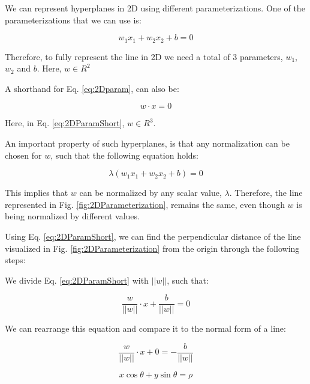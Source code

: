 \documentclass[11pt]{article}
\begin{document}
We can represent hyperplanes in 2D using different parameterizations. One of the parameterizations that we can use is:

\begin{equation} \label{eq:2Dparam}
    w_{1}x_{1} + w_{2}x_{2} + b = 0
\end{equation}

Therefore, to fully represent the line in 2D we need a total of 3 parameters, $w_{1}$, $w_{2}$ and $b$. Here, $w \in R^{2}$

A shorthand for Eq. \ref{eq:2Dparam}, can also be:

\begin{equation} \label{eq:2DParamShort}
    w \cdot x = 0
\end{equation}

Here, in Eq. \ref{eq:2DParamShort}, $w \in R^3$.

An important property of such hyperplanes, is that any normalization can be chosen for $w$, such that the following equation holds:

\begin{equation}\label{eq:lambdaParameterization}
    \lambda (w_1 x_1 + w_2 x_2 + b ) = 0
\end{equation}

This implies that $w$ can be normalized by any scalar value, $\lambda$. Therefore, the line represented in Fig. \ref{fig:2DParameterization}, remains the same, even though $w$ is being normalized by different values.

Using Eq. \ref{eq:2DParamShort}, we can find the perpendicular distance of the line visualized in Fig. \ref{fig:2DParameterization} from the origin through the following steps:

We divide Eq. \ref{eq:2DParamShort} with $||w||$, such that:

\begin{equation}
    \dfrac{w}{||w||} \cdot x + \dfrac{b}{||w||} = 0
\end{equation}

We can rearrange this equation and compare it to the normal form of a line:

\begin{equation}\label{eq:normalFormPre}
    \dfrac{w}{||w||} \cdot x + 0 =  - \dfrac{b}{||w||}
\end{equation}

\begin{equation} \label{eq:normalForm}
    x \cos{\theta} + y \sin{\theta} =  \rho
\end{equation}
\end{document}
